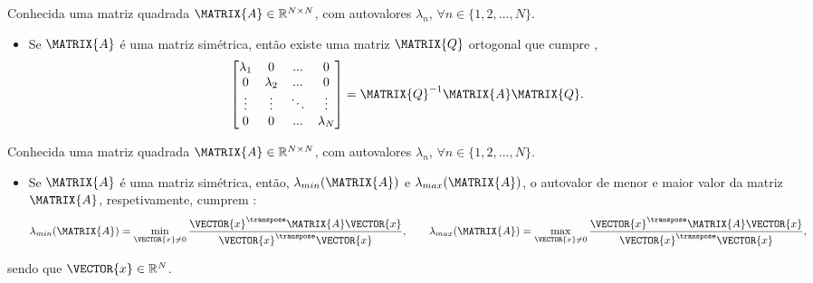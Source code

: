\begin{theorem}\label{theo:simetricmatrix2}
Conhecida uma matriz quadrada $\MATRIX{A} \in \mathbb{R}^{N \times N}$, 
com  autovalores $\lambda_n$, $\forall n \in \{1, 2, ..., N\}$.
\begin{itemize}
\item Se $\MATRIX{A}$ é uma matriz simétrica, então
existe uma matriz $\MATRIX{Q}$ ortogonal que cumpre \cite[pp. 67,440]{golub2013matrix},
\begin{equation}
\begin{bmatrix}
\lambda_1 & 0         & ...    & 0 \\
0         & \lambda_2 & ...    & 0 \\
\vdots    & \vdots    & \ddots & \vdots \\
0         & 0         & ...    & \lambda_N
\end{bmatrix}
=\MATRIX{Q}^{-1}\MATRIX{A}\MATRIX{Q}.
\end{equation}
\end{itemize}
\end{theorem}

\begin{theorem}\label{theo:simetricmatrix3}
Conhecida uma matriz quadrada $\MATRIX{A} \in \mathbb{R}^{N \times N}$, 
com  autovalores $\lambda_n$, $\forall n \in \{1, 2, ..., N\}$.
\begin{itemize}
\item Se $\MATRIX{A}$ é uma matriz simétrica, então, $\lambda_{min}(\MATRIX{A})$ e $\lambda_{max}(\MATRIX{A})$,
o autovalor de menor e maior valor da  matriz $\MATRIX{A}$, respetivamente, cumprem \cite[pp. 67]{golub2013matrix}:
\begin{equation}
\lambda_{min}(\MATRIX{A}) = \min_{\VECTOR{x}\neq 0} \frac{\VECTOR{x}^{\transpose}\MATRIX{A}\VECTOR{x}}{\VECTOR{x}^{\transpose}\VECTOR{x}},
\qquad
\lambda_{max}(\MATRIX{A}) = \max_{\VECTOR{x}\neq 0} \frac{\VECTOR{x}^{\transpose}\MATRIX{A}\VECTOR{x}}{\VECTOR{x}^{\transpose}\VECTOR{x}},
\end{equation}
\end{itemize}
sendo que $\VECTOR{x} \in \mathbb{R}^N$.
\end{theorem}

